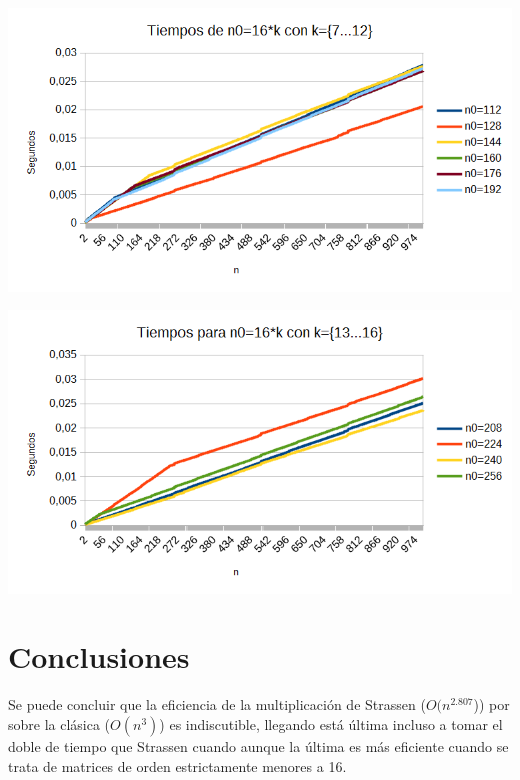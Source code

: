 \documentclass[12pt,letterpaper]{scrartcl}
\begin{document}
\includegraphics[scale=0.6]{7-12.png} 

\includegraphics[scale=0.6]{13-16.png} 
\newpage
\section{Conclusiones}

Se puede concluir que la eficiencia de la multiplicación de Strassen ($O(n^{2.807}$)) por sobre la clásica ($O(n^{3})$) es indiscutible, llegando está última incluso a tomar el doble de tiempo que Strassen cuando aunque la última es más eficiente cuando se trata de matrices de orden estrictamente menores a 16.
\end{document}
